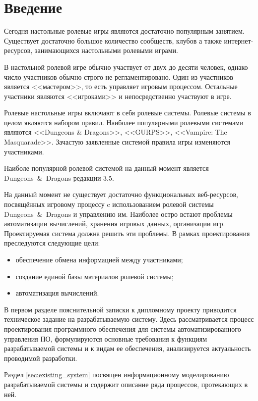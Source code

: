 \section*{Введение}

Сегодня настольные ролевые игры являются достаточно популярным занятием. Существует достаточно большое количество сообществ, клубов а также интернет-ресурсов, занимающихся настольными ролевыми играми. %

В настольной ролевой игре обычно участвует от двух до десяти человек, однако число участников обычно строго не регламентировано. Один из участников является <<мастером>>, то есть управляет игровым процессом. Остальные участники являются <<игроками>> и непосредственно участвуют в игре.

Ролевые настольные игры включают в себя ролевые системы. Ролевые системы в целом являются набором правил. Наиболее популярными ролевыми системами являются <<Dungeons \& Dragons>>, <<GURPS>>, <<Vampire: The Masquarade>>. Зачастую заявленные системой правила игры изменяются участниками.

Наиболе популярной ролевой системой на данный момент является Dungeons~\&~Dragons редакции 3.5.

На данный момент не существует достаточно функциональных веб-ресурсов, посвящённых игровому процессу c использованием ролевой системы Dungeons~\&~Dragons и управлению им. Наиболее остро встают проблемы автоматизации вычислений, хранения игровых данных, организации игр. Проектируемая система должна решить эти проблемы.
В рамках проектирования преследуются следующие цели:
\begin{itemize}
\item обеспечение обмена информацией между участниками;
\item создание единой базы материалов ролевой системы;
\item автоматизация вычислений.
\end{itemize}

В первом разделе пояснительной записки к дипломному проекту приводится техническое задание на разрабатываемую систему. Здесь рассматривается процесс проектирования программного обеспечения для системы автоматизированного управления ПО, формулируются основные требования к функциям разрабатываемой системы и к видам ее обеспечения, анализируется актуальность проводимой разработки.

Раздел \ref{sec:existing_system} посвящен информационному моделированию разрабатываемой системы и содержит описание ряда процессов, протекающих в ней.

